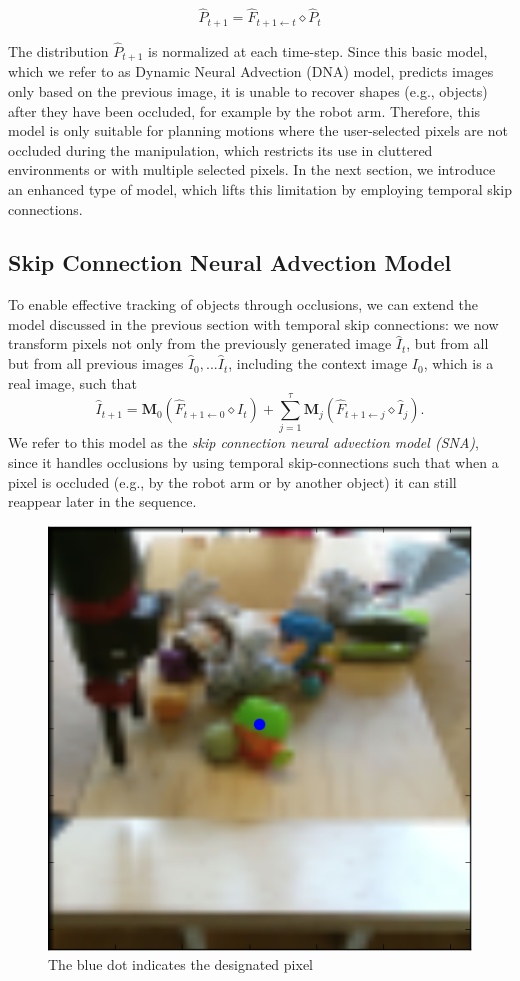  \begin{equation}
\hat{P}_{t+1} = \hat{F}_{t+1 \leftarrow t} \diamond  \hat{P}_t
 \label{eqn:prob_forward}
 \end{equation}
 
The distribution $\hat{P}_{t+1}$ is normalized at each time-step. Since this basic model, which we refer to as Dynamic Neural Advection (DNA)
model, predicts images only based on the previous image, it is unable to recover shapes (e.g., objects) after they have been occluded, for example by the robot arm. Therefore, this model is only suitable for planning motions where the user-selected pixels are not occluded during the manipulation, which restricts its use in cluttered environments or with multiple selected pixels. In the next section, we introduce an enhanced type of model, which lifts this limitation by employing temporal skip connections.

\subsection{Skip Connection Neural Advection Model}
\label{subsec:skip}
\label{sec:occlusion_model}
To enable effective tracking of objects through occlusions, we can extend the model discussed in the previous section with temporal skip connections: we now transform pixels not only from the previously generated image $\hat{I}_t$, but from all but from all previous images $\hat{I}_0,...\hat{I}_{t}$, including the context image $I_0$, which is a real image, such that
\begin{equation}
\hat{I}_{t+1} =  \mathbf{M}_{0} (\hat{F}_{t+1 \leftarrow 0} \diamond I_t) +  \sum_{j=1}^{\tau} \mathbf{M}_{j} (\hat{F}_{t+1 \leftarrow j} \diamond  \hat{I}_j).
\end{equation}
We refer to this model as the \emph{skip connection neural advection model (SNA)}, since it handles occlusions by using temporal skip-connections such that when a pixel is occluded (e.g., by the robot arm or by another object) it can still reappear later in the sequence.
 
 \begin{figure}
 	\centering
 	\includegraphics[width=0.4\columnwidth]{images_sna/occlusionaware/img_desigpixb0.png}
 	\caption{The blue dot indicates the designated pixel}
 	\label{fig:desig_pix_bluedot}
 \end{figure}

